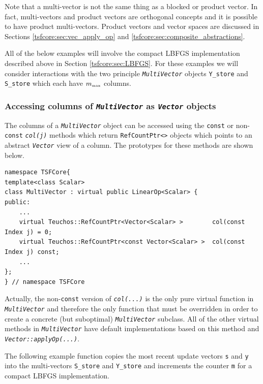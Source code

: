 Note that a multi-vector is not the same thing as a blocked or product
vector.  In fact, multi-vectors and product vectors are orthogonal
concepts and it is possible to have product multi-vectors.  Product
vectors and vector spaces are discussed in Sections
\ref{tsfcore:sec:vec_apply_op} and \ref{tsfcore:sec:composite_abstractions}.

All of the below examples will involve the compact LBFGS
implementation described above in Section \ref{tsfcore:sec:LBFGS}.
For these examples we will consider interactions with the two
principle
\texttt{\textit{Multi\-Vector}} objects \texttt{Y\_store} and
\texttt{S\_store} which each have $m_{\tiny\mbox{max}}$ columns.

%
\subsubsection{Accessing columns of \texttt{\textit{Multi\-Vector}}
as \texttt{\textit{Vector}} objects}
%

The columns of a \texttt{\textit{Multi\-Vector}} object can be accessed
using the \texttt{const} or non-\texttt{const}
\texttt{\textit{col(j)}} methods which return
\texttt{RefCountPtr<>} objects which points to an abstract
\texttt{\textit{Vector}} view of a column.  The prototypes for these
methods are shown below.

{\scriptsize\begin{verbatim}
namespace TSFCore{
template<class Scalar>
class MultiVector : virtual public LinearOp<Scalar> {
public:
    ...
    virtual Teuchos::RefCountPtr<Vector<Scalar> >        col(const Index j) = 0;
    virtual Teuchos::RefCountPtr<const Vector<Scalar> >  col(const Index j) const;
    ...
};
} // namespace TSFCore
\end{verbatim}}

\noindent Actually, the non-\texttt{const} version of \texttt{\textit{col(...)}}
is the only pure virtual function in \texttt{\textit{Multi\-Vector}} and
therefore the only function that must be overridden in order to create
a concrete (but suboptimal) \texttt{\textit{Multi\-Vector}} subclass.
All of the other virtual methods in \texttt{\textit{Multi\-Vector}} have
default implementations based on this method and
\texttt{\textit{Vector\-::applyOp(\-...)}}.

The following example function copies the most recent update vectors
\texttt{s} and \texttt{y} into the multi-vectors \texttt{S\_store}
and \texttt{Y\_store} and increments the counter \texttt{m} for a
compact LBFGS implementation.

